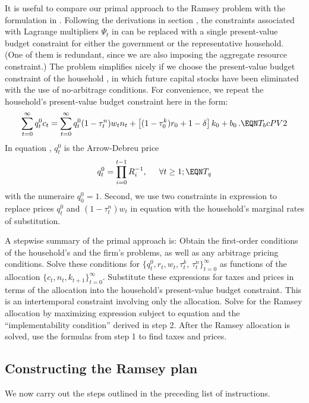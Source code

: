 It is useful to compare our primal approach to the Ramsey problem
with the formulation in .
Following the derivations in section ,
the constraints associated with Lagrange multipliers $\Psi_t$ in 
can be replaced with a
single present-value budget constraint
for either the government or the representative household. (One
of them is redundant, since we are also imposing the aggregate resource
constraint.) The problem simplifies nicely if
we choose the present-value budget constraint of the household
, in which future capital stocks have been eliminated with
the use of no-arbitrage conditions. For convenience, we repeat the
household's present-value budget constraint  here in the form:
$$
\sum_{t=0}^\infty q^0_t c_t =
\sum_{t=0}^\infty q^0_t (1-\tau^n_t) w_t n_t
   + \left[(1-\tau^k_{0}) r_{0} + 1-\delta \right] k_0 + b_0\,.
                                                              \EQN T_bcPV2
$$
In  equation , $q^0_t$ is the Arrow-Debreu price
$$
q^0_t = \prod_{i=0}^{t-1} R_i^{-1}, \hskip.5cm \forall t\geq1;    \EQN T_q
$$
with the numeraire $q^0_0=1$. Second, we use two
constraints in expression  to replace prices
$q^0_t$ and $(1-\tau^n_t) w_t$ in equation  with the household's
marginal rates of substitution.

A stepwise summary of the primal approach is:
\medskip
{} Obtain the first-order conditions of the household's
and the firm's problems, as well as any arbitrage pricing conditions.
Solve these conditions for
$\{q^0_t, r_t, w_t, \tau^k_t$,
$\tau^n_t\}_{t=0}^\infty$
as functions
of the allocation $\{c_t, n_t, k_{t+1}\}_{t=0}^\infty$.
\medskip
{}  Substitute these expressions for taxes  and
prices in terms of the allocation into the household's
present-value budget constraint.   This is an intertemporal constraint
involving only the allocation.
\medskip
{}  Solve for the Ramsey allocation by maximizing
expression  subject to  equation  and the
``implementability condition'' derived in step 2.
\medskip
{}  After the Ramsey  allocation is solved,
use the formulas from step 1 to find taxes and
prices.

\subsection{Constructing the Ramsey plan}
We now carry out the steps outlined in the preceding list of
instructions.

